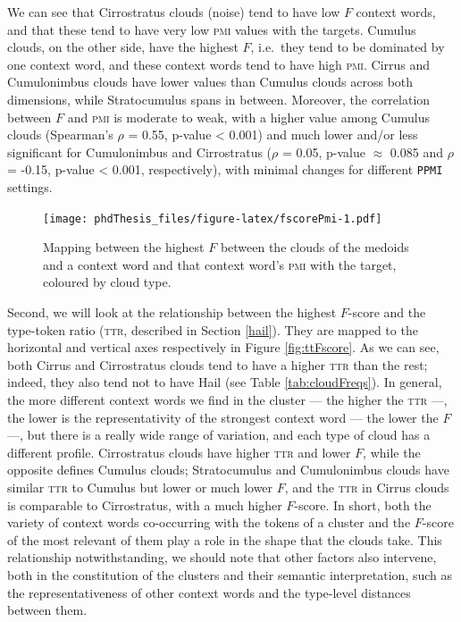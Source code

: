 \documentclass[
]{book}
\begin{document}
We can see that Cirrostratus clouds (noise) tend to have low \(F\) context words, and that these tend to have very low \textsc{pmi} values with the targets. Cumulus clouds, on the other side, have the highest \(F\), i.e.~they tend to be dominated by one context word, and these context words tend to have high \textsc{pmi}. Cirrus and Cumulonimbus clouds have lower values than Cumulus clouds across both dimensions, while Stratocumulus spans in between. Moreover, the correlation between \(F\) and \textsc{pmi} is moderate to weak, with a higher value among Cumulus clouds (Spearman's \(\rho\) = 0.55, p-value \textless{} 0.001) and much lower and/or less significant for Cumulonimbus and Cirrostratus
(\(\rho\) = 0.05, p-value \(\approx\) 0.085 and \(\rho\) = -0.15, p-value \textless{} 0.001, respectively), with minimal changes for different \texttt{PPMI} settings.



\begin{figure}
\centering
\texttt{[image: phdThesis\_files/figure-latex/fscorePmi-1.pdf]}
\caption{\label{fig:fscorePmi}Mapping between the highest \(F\) between the clouds of the medoids and a context word and that context word's \textsc{pmi} with the target, coloured by cloud type.}
\end{figure}

Second, we will look at the relationship between the highest \(F\)-score and the type-token ratio (\textsc{ttr}, described in Section \ref{hail}). They are mapped to the horizontal and vertical axes respectively in Figure \ref{fig:ttFscore}. As we can see, both Cirrus and Cirrostratus clouds tend to have a higher \textsc{ttr} than the rest; indeed, they also tend not to have Hail (see Table \ref{tab:cloudFreqs}). In general, the more different context words we find in the cluster --- the higher the \textsc{ttr} ---, the lower is the representativity of the strongest context word --- the lower the \(F\) ---, but there is a really wide range of variation, and each type of cloud has a different profile. Cirrostratus clouds have higher \textsc{ttr} and lower \(F\), while the opposite defines Cumulus clouds; Stratocumulus and Cumulonimbus clouds have similar \textsc{ttr} to Cumulus but lower or much lower \(F\), and the \textsc{ttr} in Cirrus clouds is comparable to Cirrostratus, with a much higher \(F\)-score.
In short, both the variety of context words co-occurring with the tokens of a cluster and the \(F\)-score of the most relevant of them play a role in the shape that the clouds take. This relationship notwithstanding, we should note that other factors also intervene, both in the constitution of the clusters and their semantic interpretation, such as the representativeness of other context words and the type-level distances between them.
\end{document}
